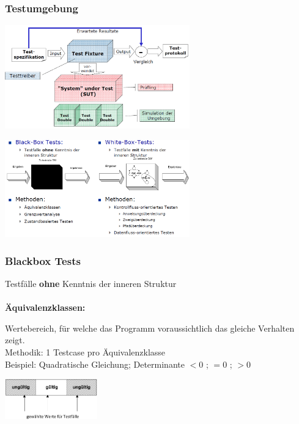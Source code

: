 \subsubsection{Testumgebung}
\begin{minipage}{0.5\linewidth}
\includegraphics[width=8cm]{images/testumgebung}
\end{minipage}
\begin{minipage}{0.5\linewidth}
	\includegraphics[width=8cm]{images/blackwhitetests}
\end{minipage}
\subsubsection{Blackbox Tests}
Testfälle \textbf{ohne} Kenntnis der inneren Struktur\\\\
\textbf{Äquivalenzklassen:} \\
\begin{minipage}{10cm}
Wertebereich, für welche das Programm voraussichtlich das gleiche Verhalten zeigt. \\
Methodik: 1 Testcase pro Äquivalenzklasse \\
Beispiel: Quadratische Gleichung; Determinante $<0$ ; $=0$ ; $>0$ \\
\vspace{2cm}
\end{minipage}
\begin{minipage}{4cm}
	\includegraphics[width=4cm]{images/aequivalenzklasse.png}
\end{minipage}

